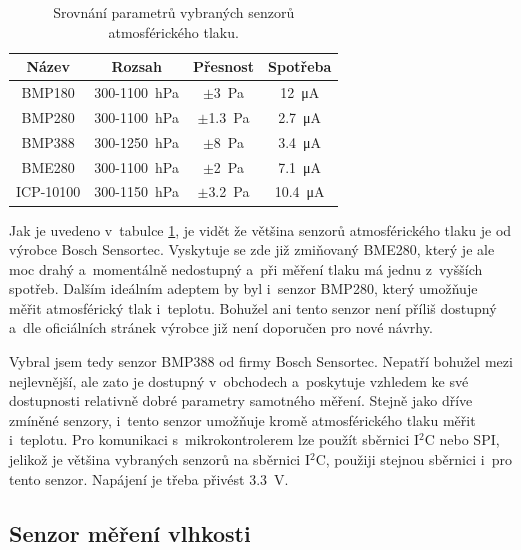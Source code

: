 \begin{table}
    \centering
    \begin{tabular}{c|ccc}
        \textbf{Název} & \textbf{Rozsah}                     & \textbf{Přesnost}      & \textbf{Spotřeba}        \\ \hline
        BMP180         & \SI{300}{}-\SI{1100}{\hecto\pascal} & $\pm$\SI{3}{\pascal}   & \SI{12}{\micro\ampere}   \\
        BMP280         & \SI{300}{}-\SI{1100}{\hecto\pascal} & $\pm$\SI{1,3}{\pascal} & \SI{2,7}{\micro\ampere}  \\
        BMP388         & \SI{300}{}-\SI{1250}{\hecto\pascal} & $\pm$\SI{8}{\pascal}   & \SI{3,4}{\micro\ampere}  \\
        BME280         & \SI{300}{}-\SI{1100}{\hecto\pascal} & $\pm$\SI{2}{\pascal}   & \SI{7,1}{\micro\ampere}  \\
        ICP-10100      & \SI{300}{}-\SI{1150}{\hecto\pascal} & $\pm$\SI{3,2}{\pascal} & \SI{10,4}{\micro\ampere} 
    \end{tabular}
    \caption{Srovnání parametrů vybraných senzorů atmosférického tlaku.}
    \label{tab_AirPressureSensors}
\end{table}

Jak je uvedeno v~tabulce \ref{tab_AirPressureSensors}, je vidět že většina senzorů atmosférického tlaku je od výrobce Bosch Sensortec. Vyskytuje se zde již zmiňovaný BME280, který je ale moc drahý a~momentálně nedostupný a~při měření tlaku má jednu z~vyšších spotřeb. Dalším ideálním adeptem by byl i~senzor BMP280, který umožňuje měřit atmosférický tlak i~teplotu. Bohužel ani tento senzor není příliš dostupný a~dle oficiálních stránek výrobce již není doporučen pro nové návrhy.

Vybral jsem tedy senzor BMP388 od firmy Bosch Sensortec. Nepatří bohužel mezi nejlevnější, ale zato je dostupný v~obchodech a~poskytuje vzhledem ke své dostupnosti relativně dobré parametry samotného měření. Stejně jako dříve zmíněné senzory, i~tento senzor umožňuje kromě atmosférického tlaku měřit i~teplotu. Pro komunikaci s~mikrokontrolerem lze použít sběrnici I$^2$C nebo SPI, jelikož je většina vybraných senzorů na sběrnici I$^2$C, použiji stejnou sběrnici i~pro tento senzor. Napájení je třeba přivést \SI{3,3}{\volt}.

\subsection{Senzor měření vlhkosti}

